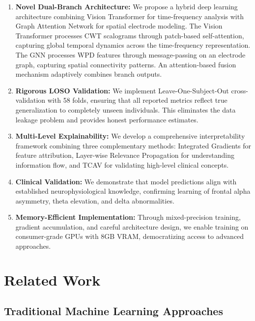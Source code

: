 \documentclass[blue,fullpaper]{ludusofficial}  %
\begin{document}
\begin{enumerate}
    \item \textbf{Novel Dual-Branch Architecture:} We propose a hybrid deep learning architecture combining Vision Transformer for time-frequency analysis with Graph Attention Network for spatial electrode modeling. The Vision Transformer processes CWT scalograms through patch-based self-attention, capturing global temporal dynamics across the time-frequency representation. The GNN processes WPD features through message-passing on an electrode graph, capturing spatial connectivity patterns. An attention-based fusion mechanism adaptively combines branch outputs.

    \item \textbf{Rigorous LOSO Validation:} We implement Leave-One-Subject-Out cross-validation with 58 folds, ensuring that all reported metrics reflect true generalization to completely unseen individuals. This eliminates the data leakage problem and provides honest performance estimates.

    \item \textbf{Multi-Level Explainability:} We develop a comprehensive interpretability framework combining three complementary methods: Integrated Gradients for feature attribution, Layer-wise Relevance Propagation for understanding information flow, and TCAV for validating high-level clinical concepts.

    \item \textbf{Clinical Validation:} We demonstrate that model predictions align with established neurophysiological knowledge, confirming learning of frontal alpha asymmetry, theta elevation, and delta abnormalities.

    \item \textbf{Memory-Efficient Implementation:} Through mixed-precision training, gradient accumulation, and careful architecture design, we enable training on consumer-grade GPUs with 8GB VRAM, democratizing access to advanced approaches.
\end{enumerate}

\section{Related Work}

\subsection{Traditional Machine Learning Approaches}
\end{document}

